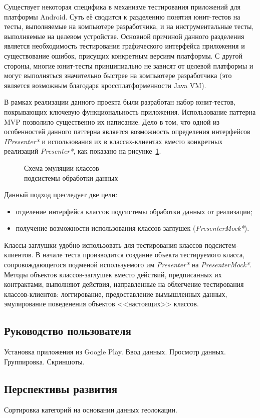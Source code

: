 Существует некоторая специфика в механизме тестирования приложений
для платформы Android. Суть её сводится к разделению понятия юнит-тестов
на тесты, выполняемые на компьютере разработчика, и на инструментальные тесты,
выполняемые на целевом устройстве.
Основной причиной данного разделения является необходимость тестирования
графического интерфейса приложения и существование ошибок,
присущих конкретным версиям платформы.
С другой стороны, многие юнит-тесты принципиально не зависят от
целевой платформы и могут выполняться значительно быстрее
на компьютере разработчика
(это является возможным благодаря кроссплатформенности Java VM).

В рамках реализации данного проекта были разработан набор юнит-тестов,
покрывающих ключевую функциональность приложения.
Использование паттерна MVP позволило существенно их написание.
Дело в том, что одной из особенностей данного паттерна является возможность
определения интерфейсов \textit{IPresenter*} и использования
их в классах-клиентах вместо конкретных реализаций \textit{Presenter*},
как показано на рисунке~\ref{fig:implementation_testing_presenter}.

\begin{figure}[h!]
  \centering
  \caption{Схема эмуляции классов \\ подсистемы обработки данных}
  \label{fig:implementation_testing_presenter}
\end{figure}

Данный подход преследует две цели:
\begin{itemize}
\item отделение интерфейса классов подсистемы обработки данных от реализации;
\item получение возможности использования классов-заглушек (\textit{PresenterMock*}).
\end{itemize}

Классы-заглушки удобно использовать для тестирования классов подсистем-клиентов.
В начале теста производится создание объекта тестируемого класса,
сопровождающегося подменой используемого им \textit{Presenter*}
на \textit{PresenterMock*}.
Методы объектов классов-заглушек вместо действий, предписанных их контрактами,
выполняют действия, направленные на облегчение тестирования классов-клиентов:
логгирование, предоставление вымышленных данных,
эмулирование поведенения объектов <<настоящих>> классов.

\subsection{Руководство пользователя}

Установка приложения из Google Play.
Ввод данных. Просмотр данных. Группировка.
Скриншоты.

\subsection{Перспективы развития}

Сортировка категорий на основании данных геолокации.
